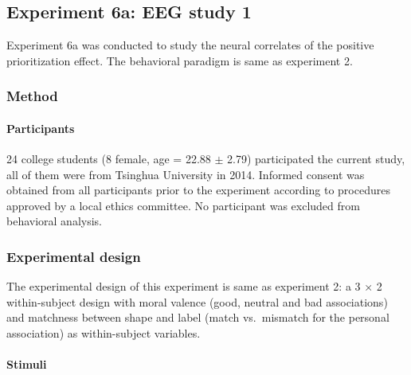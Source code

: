 \documentclass[
  english,
  man]{apa6}
\let\oldparagraph\paragraph
\renewcommand{\paragraph}[1]{\oldparagraph{#1}\mbox{}}
\begin{document}
\hypertarget{experiment-6a-eeg-study-1}{%
\subsection{Experiment 6a: EEG study 1}\label{experiment-6a-eeg-study-1}}

Experiment 6a was conducted to study the neural correlates of the positive prioritization effect. The behavioral paradigm is same as experiment 2.

\hypertarget{method-3}{%
\subsubsection{Method}\label{method-3}}

\hypertarget{participants-4}{%
\paragraph{Participants}\label{participants-4}}

24 college students (8 female, age = 22.88 \(\pm\) 2.79) participated the current study, all of them were from Tsinghua University in 2014. Informed consent was obtained from all participants prior to the experiment according to procedures approved by a local ethics committee. No participant was excluded from behavioral analysis.

\hypertarget{experimental-design}{%
\subsubsection{Experimental design}\label{experimental-design}}

The experimental design of this experiment is same as experiment 2: a 3 × 2 within-subject design with moral valence (good, neutral and bad associations) and matchness between shape and label (match vs.~mismatch for the personal association) as within-subject variables.

\hypertarget{stimuli}{%
\paragraph{Stimuli}\label{stimuli}}
\end{document}
